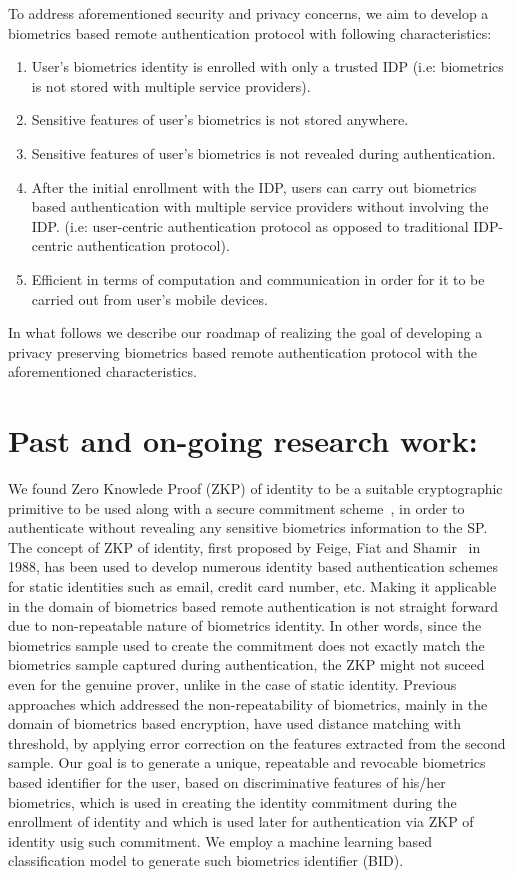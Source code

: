 \documentclass[10pt]{article}
\begin{document}
To address aforementioned security and privacy concerns, we aim to develop a biometrics based remote authentication protocol with following 
characteristics:
\begin{enumerate}
 \item User's biometrics identity is enrolled with only a trusted IDP (i.e: biometrics is not stored with multiple service providers).
 \item Sensitive features of user's biometrics is not stored anywhere.
 \item Sensitive features of user's biometrics is not revealed during authentication.
 \item After the initial enrollment with the IDP, users can carry out biometrics based authentication with multiple service providers without 
involving the IDP. (i.e: user-centric authentication protocol as opposed to traditional IDP-centric authentication protocol).
 \item Efficient in terms of computation and communication in order for it to be carried out from user's mobile devices.
\end{enumerate}

In what follows we describe our roadmap of realizing the goal of developing a privacy preserving biometrics based remote authentication protocol with 
the aforementioned characteristics.

\section{Past and on-going research work:}
We found Zero Knowlede Proof (ZKP) of identity to be a suitable cryptographic primitive to be used along with a secure commitment 
scheme~\cite{pedersenCommitment}, in order to authenticate without revealing any sensitive biometrics information to the SP. The concept of ZKP of 
identity, first proposed by Feige, Fiat and Shamir~\cite{fiat-shamir} in 1988, has been used to develop numerous identity based authentication 
schemes~\cite{idemixConcepts, DAA} for static identities such as email, credit card number, etc. Making it applicable in the domain of biometrics 
based remote authentication is not straight forward due to non-repeatable nature of biometrics identity. 
In other words, since the biometrics sample used to create the commitment does not exactly match the biometrics sample captured during 
authentication, the ZKP might not suceed even for the genuine prover, unlike in the case of static identity.
Previous approaches which addressed the non-repeatability of biometrics, mainly in the domain of biometrics based encryption, have used distance 
matching with threshold, by applying error correction on the features extracted from the second sample. 
Our goal is to generate a unique, repeatable and revocable biometrics based identifier for the user, based on discriminative features of his/her 
biometrics, which is used in creating the identity commitment during the enrollment of identity and which is used later for authentication 
via ZKP of identity usig such commitment. We employ a machine learning based classification model to generate such biometrics identifier (BID).
\end{document}
